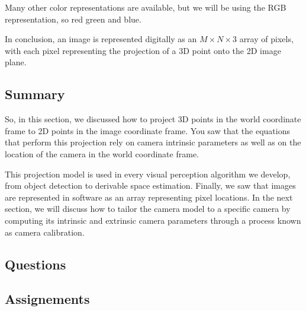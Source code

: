Many other color representations are available, but we will be using
the RGB representation, so red green and blue. 

In conclusion, an image is represented digitally as an $M \times N \times 3$ array of pixels, with each pixel
representing the projection of a 3D point onto
the 2D image plane. 

\subsection{Summary}

So, in this section, we discussed how to project 3D points in the world coordinate frame to 2D points in
the image coordinate frame. You saw that the equations that perform this projection rely on camera intrinsic
parameters as well as on the location of the camera in the world coordinate frame.  

This projection model is used in every visual perception algorithm we develop, from object detection to
derivable space estimation. Finally, we saw that images are represented in software as an array
representing pixel locations.  In the next section, we will discuss how to
tailor the camera model to a specific camera by computing its intrinsic and extrinsic
camera parameters through a process known as camera calibration.

\subsection{Questions}

\subsection{Assignements}
